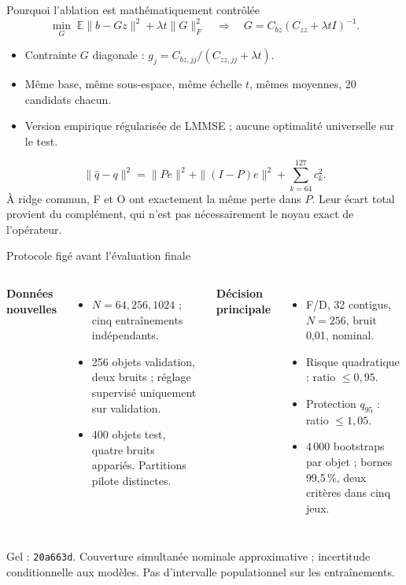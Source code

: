 \documentclass[aspectratio=169,10pt]{beamer}
\begin{document}
\begin{frame}{Pourquoi l'ablation est mathématiquement contrôlée}
\[
\min_G\;\mathbb E\|b-Gz\|^2+\lambda t\|G\|_F^2
\quad\Longrightarrow\quad G=C_{bz}(C_{zz}+\lambda tI)^{-1}.
\]
\begin{itemize}
\item Contrainte $G$ diagonale : $g_j=C_{bz,jj}/(C_{zz,jj}+\lambda t)$.
\item Même base, même sous-espace, même échelle $t$, mêmes moyennes, 20 candidats chacun.
\item Version empirique régularisée de LMMSE ; aucune optimalité universelle sur le test.
\end{itemize}
\[
\|\widehat q-q\|^2=\|Pe\|^2+\|(I-P)e\|^2+\sum_{k=64}^{127}c_k^2.
\]
\small À ridge commun, F et O ont exactement la même perte dans $P$. Leur écart total provient du complément, qui n'est pas nécessairement le noyau exact de l'opérateur.
\end{frame}

\begin{frame}{Protocole figé avant l'évaluation finale}
\begin{columns}[T]
\textbf{Données nouvelles}
\begin{itemize}
\item $N=64,256,1024$ ; cinq entraînements indépendants.
\item 256 objets validation, deux bruits ; réglage supervisé uniquement sur validation.
\item 400 objets test, quatre bruits appariés. Partitions pilote distinctes.
\end{itemize}
\textbf{Décision principale}
\begin{itemize}
\item F/D, 32 contigus, $N=256$, bruit 0,01, nominal.
\item Risque quadratique : ratio $\leq0,95$.
\item Protection $q_{95}$ : ratio $\leq1,05$.
\item 4\,000 bootstraps par objet ; bornes 99,5\,\%, deux critères dans cinq jeux.
\end{itemize}
\end{columns}
\par\vspace{3mm}
\small Gel : \texttt{20a663d}. Couverture simultanée nominale approximative ; incertitude conditionnelle aux modèles. Pas d'intervalle populationnel sur les entraînements.
\end{frame}
\end{document}
